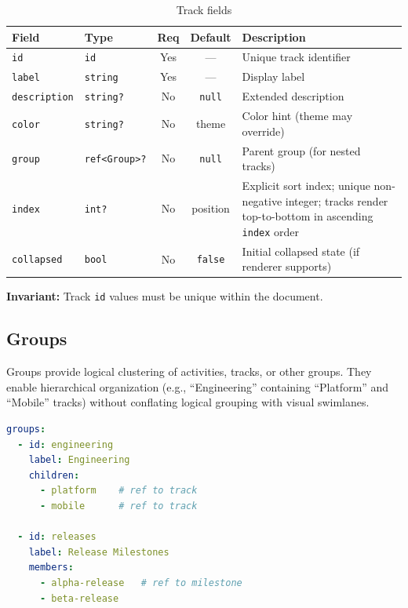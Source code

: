 \begin{table}[h]
\centering
\small
\begin{tabular}{llccp{4.5cm}}
\toprule
\textbf{Field} & \textbf{Type} & \textbf{Req} & \textbf{Default} & \textbf{Description} \\
\midrule
\texttt{id} & \texttt{id} & Yes & --- & Unique track identifier \\
\texttt{label} & \texttt{string} & Yes & --- & Display label \\
\texttt{description} & \texttt{string?} & No & \texttt{null} & Extended description \\
\texttt{color} & \texttt{string?} & No & theme & Color hint (theme may override) \\
\texttt{group} & \texttt{ref<Group>?} & No & \texttt{null} & Parent group (for nested tracks) \\
\texttt{index} & \texttt{int?} & No & position & Explicit sort index; unique non-negative integer; tracks render top-to-bottom in ascending \texttt{index} order \\
\texttt{collapsed} & \texttt{bool} & No & \texttt{false} & Initial collapsed state (if renderer supports) \\
\bottomrule
\end{tabular}
\caption{Track fields}
\label{tab:track-fields}
\end{table}

\textbf{Invariant:} Track \texttt{id} values must be unique within the document.

\subsection{Groups}
\label{sec:ir-groups}

Groups provide logical clustering of activities, tracks, or other groups. They enable
hierarchical organization (e.g., ``Engineering'' containing ``Platform'' and ``Mobile'' tracks)
without conflating logical grouping with visual swimlanes.

\begin{lstlisting}[language=yaml,caption={Group example}]
groups:
  - id: engineering
    label: Engineering
    children:
      - platform    # ref to track
      - mobile      # ref to track

  - id: releases
    label: Release Milestones
    members:
      - alpha-release   # ref to milestone
      - beta-release
\end{lstlisting}


